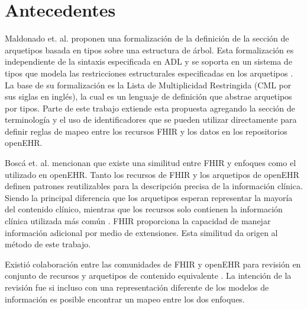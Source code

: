 \section{Antecedentes}

Maldonado et. al. proponen una formalización de la definición de la sección de arquetipos basada en tipos sobre una estructura de árbol. Esta formalización es independiente de la sintaxis especificada en ADL y se soporta en un sistema de tipos que modela las restricciones estructurales especificadas en los arquetipos \cite{Maldonado09}. La base de su formalización es la Lista de Multiplicidad Restringida (CML por sus siglas en inglés), la cual es un lenguaje de definición que abstrae arquetipos por tipos. Parte de este trabajo extiende esta propuesta agregando la sección de terminología y el uso de identificadores que se pueden utilizar directamente para definir reglas de mapeo entre los recursos FHIR y los datos en los repositorios openEHR.

Boscá et. al. mencionan que existe una similitud entre FHIR y enfoques como el utilizado en openEHR. Tanto los recursos de FHIR y los arquetipos de openEHR definen patrones reutilizables para la descripción precisa de la información clínica. Siendo la principal diferencia que los arquetipos esperan representar la mayoría del contenido clínico, mientras que los recursos solo contienen la información clínica utilizada más común \cite{Bosca15}. FHIR proporciona la capacidad de manejar información adicional por medio de extensiones. Esta similitud da origen al método de este trabajo.

Existió colaboración entre las comunidades de FHIR y openEHR para revisión en conjunto de recursos y arquetipos de contenido equivalente \cite{Collaboration}. La intención de la revisión fue si incluso con una representación diferente de los modelos de información es posible encontrar un mapeo entre los dos enfoques.
